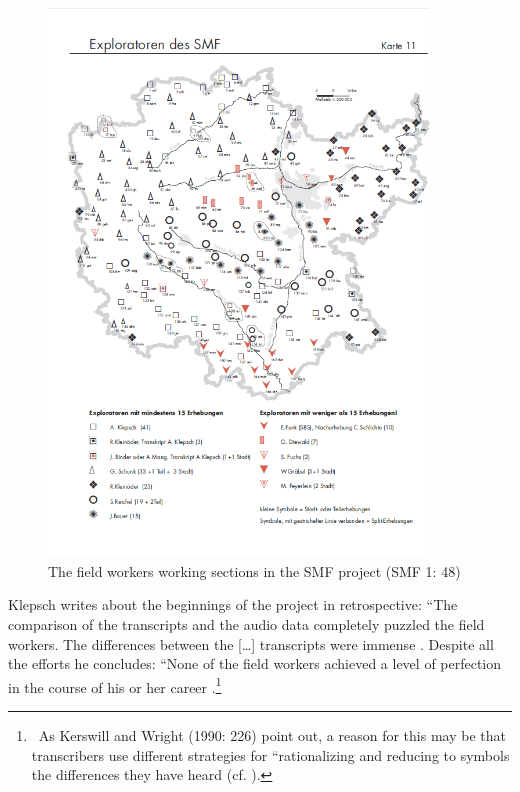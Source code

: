 \documentclass[output=paper]{LSP/langsci}
\begin{document}
\begin{figure}
\includegraphics[width=0.9\textwidth]{illustrations/mathus_fig5}
\caption{The field workers{\textquotesingle} working sections in the SMF project (SMF 1: 48)}
\label{fig:5}
\end{figure}

Klepsch writes about the beginnings of the project in retrospective: ``The comparison of the transcripts and the audio data completely puzzled the field workers. The differences between the […] transcripts were immense{\textquotedbl} \citep[25]{klepsch_wie_2013}. Despite all the efforts he concludes: ``None of the field workers achieved a level of perfection in the course of his or her career{\textquotedbl} \citep[27]{klepsch_wie_2013}.\footnote{\ As Kerswill and Wright (1990: 226) point out, a reason for this may be that transcribers use different strategies for ``rationalizing and reducing to symbols the differences they have heard{\textquotedbl} (cf. \citealt[269]{kerswill_limits_1990}).}
\end{document}
